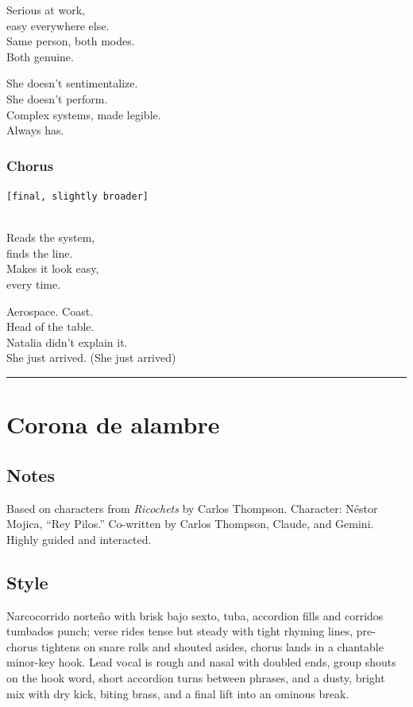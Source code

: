 Serious at work,\\
easy everywhere else.\\
Same person, both modes.\\
Both genuine.

She doesn't sentimentalize.\\
She doesn't perform.\\
Complex systems, made legible.\\
Always has.

\subsubsection{Chorus}\label{chorus-58}

\texttt{{[}final,\ slightly\ broader{]}}\strut \\
Reads the system,\\
finds the line.\\
Makes it look easy,\\
every time.

Aerospace. Coast.\\
Head of the table.\\
Natalia didn't explain it.\\
She just arrived. (She just arrived)

\begin{center}\rule{0.5\linewidth}{0.5pt}\end{center}

\section{Corona de alambre}\label{corona-de-alambre}

\subsection{Notes}\label{notes-23}

Based on characters from \emph{Ricochets} by Carlos Thompson. Character:
Néstor Mojica, ``Rey Pilos.'' Co-written by Carlos Thompson, Claude, and
Gemini. Highly guided and interacted.

\subsection{Style}\label{style-22}

Narcocorrido norteño with brisk bajo sexto, tuba, accordion fills and
corridos tumbados punch; verse rides tense but steady with tight rhyming
lines, pre-chorus tightens on snare rolls and shouted asides, chorus
lands in a chantable minor-key hook. Lead vocal is rough and nasal with
doubled ends, group shouts on the hook word, short accordion turns
between phrases, and a dusty, bright mix with dry kick, biting brass,
and a final lift into an ominous break.

